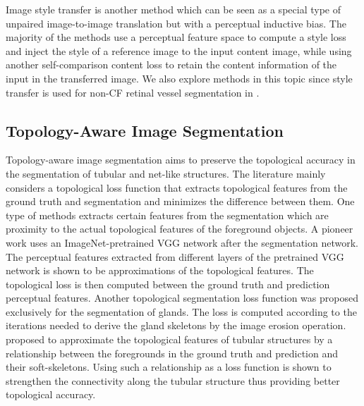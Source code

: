 Image style transfer \cite{Trans-NAAS, Trans-PerceptualLoss, Trans-EFDM, Trans-StyTr2, Trans-StyleDiffusion} is another method which can be seen as a special type of unpaired image-to-image translation but with a perceptual inductive bias. The majority of the methods use a perceptual feature space to compute a style loss and inject the style of a reference image to the input content image, while using another self-comparison content loss to retain the content information of the input in the transferred image. We also explore methods in this topic since style transfer is used for non-CF retinal vessel segmentation in \cite{MMVesseg-Zhang, MMVesseg-StyleTransferPeng}. 


\subsection{Topology-Aware Image Segmentation}
Topology-aware image segmentation aims to preserve the topological accuracy in the segmentation of tubular and net-like structures. The literature mainly considers a topological loss function that extracts topological features from the ground truth and segmentation and minimizes the difference between them. One type of methods extracts certain features from the segmentation which are proximity to the actual topological features of the foreground objects. A pioneer work \cite{Topo-PTLoss} uses an ImageNet-pretrained VGG \cite{Others-ImageNet, Others-VGG} network after the segmentation network. The perceptual features extracted from different layers of the pretrained VGG network is shown to be approximations of the topological features. The topological loss is then computed between the ground truth and prediction perceptual features. Another topological segmentation loss function \cite{Topo-GlandSeg} was proposed exclusively for the segmentation of glands. The loss is computed according to the iterations needed to derive the gland skeletons by the image erosion operation. \cite{Topo-clDice} proposed to approximate the topological features of tubular structures by a relationship between the foregrounds in the ground truth and prediction and their soft-skeletons. Using such a relationship as a loss function is shown to strengthen the connectivity along the tubular structure thus providing better topological accuracy. 

